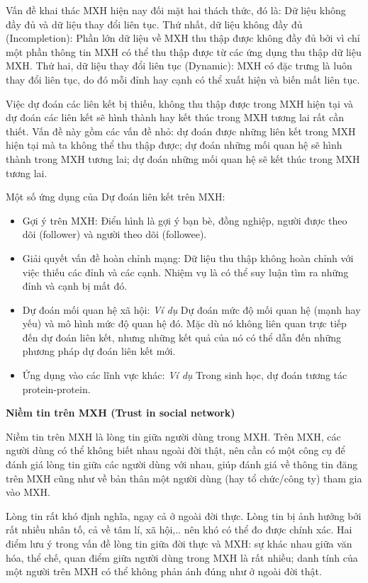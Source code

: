 \documentclass[12pt]{extarticle}
\begin{document}
			\par Vấn đề khai thác MXH hiện nay đối mặt hai thách thức, đó là: Dữ liệu không đầy đủ và dữ liệu thay đổi liên tục. Thứ nhất, dữ liệu không đầy đủ (Incompletion): Phần lớn dữ liệu về MXH thu thập được không đầy đủ bởi vì chỉ một phần thông tin MXH có thể thu thập được từ các ứng dụng thu thập dữ liệu MXH. Thứ hai, dữ liệu thay đổi liên tục (Dynamic): MXH có đặc trưng là luôn thay đổi liên tục, do đó mỗi đỉnh hay cạnh có thể xuất hiện và biến mất liên tục.
			\par Việc dự đoán các liên kết bị thiếu, không thu thập được trong MXH hiện tại và dự đoán các liên kết sẽ hình thành hay kết thúc trong MXH tương lai rất cần thiết. Vấn đề này gồm các vấn đề nhỏ: dự đoán được những liên kết trong MXH hiện tại mà ta không thể thu thập được; dự đoán những mối quan hệ sẽ hình thành trong MXH tương lai; dự đoán những mối quan hệ sẽ kết thúc trong MXH tương lai.
			\par Một số ứng dụng của Dự đoán liên kết trên MXH:
			\begin{itemize}
				\item Gợi ý trên MXH: Điển hình là gợi ý bạn bè, đồng nghiệp, người được theo dõi (follower) và người theo dõi (followee).
				\item Giải quyết vấn đề hoàn chỉnh mạng: Dữ liệu thu thập không hoàn chỉnh với việc thiếu các đỉnh và các cạnh. Nhiệm vụ là có thể suy luận tìm ra những đỉnh và cạnh bị mất đó.
				\item Dự đoán mối quan hệ xã hội: \textit{Ví dụ} Dự đoán mức độ mối quan hệ (mạnh hay yếu) và mô hình mức độ quan hệ đó. Mặc dù nó không liên quan trực tiếp đến dự đoán liên kết, nhưng những kết quả của nó có thể dẫn đến những phương pháp dự đoán liên kết mới.
				\item Ứng dụng vào các lĩnh vực khác: \textit{Ví dụ} Trong sinh học, dự đoán tương tác protein-protein. 
			\end{itemize}
			\par \textbf{Niềm tin trên MXH (Trust in social network)}
			\par Niềm tin trên MXH là lòng tin giữa người dùng trong MXH. Trên MXH, các người dùng có thể không biết nhau ngoài đời thật, nên cần có một công cụ để đánh giá lòng tin giữa các người dùng với nhau, giúp đánh giá về thông tin đăng trên MXH cũng như về bản thân một người dùng (hay tổ chức/công ty) tham gia vào MXH.
			\par Lòng tin rất khó định nghĩa, ngay cả ở ngoài đời thực. Lòng tin bị ảnh hưởng bởi rất nhiều nhân tố, cả về tâm lí, xã hội,.. nên khó có thể đo được chính xác. Hai điểm lưu ý trong vấn đề lòng tin giữa đời thực và MXH: sự khác nhau giữa văn hóa, thể chế, quan điểm giữa người dùng trong MXH là rất nhiều; danh tính của một người trên MXH có thể không phản ánh đúng như ở ngoài đời thật.
\end{document}
